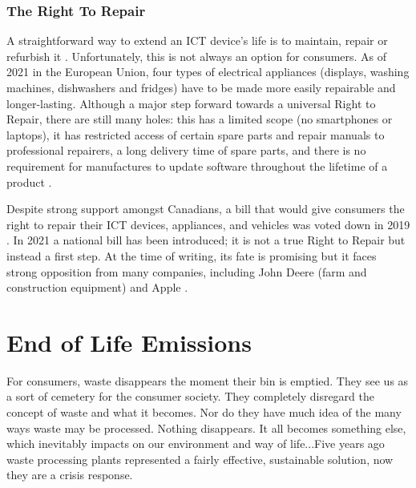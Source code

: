 \documentclass{article}
\begin{document}
\subsubsection{The Right To Repair}\label{SECTION_RIGHT_TO_REPAIR}
A straightforward way to extend an ICT device's life is to maintain, repair or refurbish it \cite{zerowastecanada2017hierarchy}. Unfortunately, this is not always an option for consumers. As of 2021 in the European Union, four types of electrical appliances (displays, washing machines, dishwashers and fridges) have to be made more easily repairable and longer-lasting. Although a major step forward towards a universal Right to Repair, there are still many holes: this has a limited scope (no smartphones or laptops), it has restricted access of certain spare parts and repair manuals to professional repairers, a long delivery time of spare parts, and there is no requirement for manufactures to update software throughout the lifetime of a product \cite{EUrighttorepair2021}.

Despite strong support amongst Canadians, a bill that would give consumers the right to repair their ICT devices, appliances, and vehicles was voted down in 2019 \cite{CArighttorepair2020fail}. In 2021 a national bill has been introduced; it is not a true Right to Repair but instead a first step. At the time of writing, its fate is promising but it faces strong opposition from many companies, including John Deere (farm and construction equipment) and Apple \cite{CArighttorepair2021national}.


\cleardoublepage
\section{End of Life Emissions} \label{SECTION_END_OF_LIFE_EMISSIONS}
 \begin{fquote}
 For consumers, waste disappears the moment their bin is emptied. They see us as a sort of cemetery for the consumer society. They completely disregard the concept of waste and what it becomes. Nor do they have much idea of the many ways waste may be processed. Nothing disappears. It all becomes something else, which inevitably impacts on our environment and way of life...Five years ago waste processing plants represented a fairly effective, sustainable solution, now they are a crisis response.
 \end{fquote}
\end{document}
